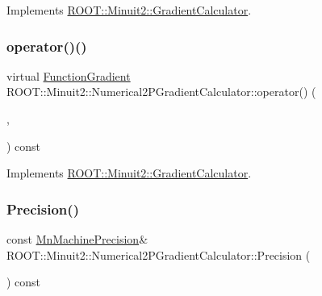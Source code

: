 Implements \mbox{\hyperlink{classROOT_1_1Minuit2_1_1GradientCalculator_a1809c1e8a89d32aabf7835e9690c2916}{R\+O\+O\+T\+::\+Minuit2\+::\+Gradient\+Calculator}}.

\mbox{\label{classROOT_1_1Minuit2_1_1Numerical2PGradientCalculator_a9ca27ef0f61a678b528f32a002e8002b}} 
\subsubsection{\texorpdfstring{operator()()}{operator()()}\hspace{0.1cm}{\footnotesize\ttfamily [9/9]}}
{\footnotesize\ttfamily virtual \mbox{\hyperlink{classROOT_1_1Minuit2_1_1FunctionGradient}{Function\+Gradient}} R\+O\+O\+T\+::\+Minuit2\+::\+Numerical2\+P\+Gradient\+Calculator\+::operator() (\begin{DoxyParamCaption}\item[{const \mbox{\hyperlink{classROOT_1_1Minuit2_1_1MinimumParameters}{Minimum\+Parameters}} \&}]{,  }\item[{const \mbox{\hyperlink{classROOT_1_1Minuit2_1_1FunctionGradient}{Function\+Gradient}} \&}]{ }\end{DoxyParamCaption}) const\hspace{0.3cm}{\ttfamily [virtual]}}



Implements \mbox{\hyperlink{classROOT_1_1Minuit2_1_1GradientCalculator_a1809c1e8a89d32aabf7835e9690c2916}{R\+O\+O\+T\+::\+Minuit2\+::\+Gradient\+Calculator}}.

\mbox{\label{classROOT_1_1Minuit2_1_1Numerical2PGradientCalculator_a2f964953d797badaf6f2cd476e330c3f}} 
\subsubsection{\texorpdfstring{Precision()}{Precision()}\hspace{0.1cm}{\footnotesize\ttfamily [1/3]}}
{\footnotesize\ttfamily const \mbox{\hyperlink{classROOT_1_1Minuit2_1_1MnMachinePrecision}{Mn\+Machine\+Precision}}\& R\+O\+O\+T\+::\+Minuit2\+::\+Numerical2\+P\+Gradient\+Calculator\+::\+Precision (\begin{DoxyParamCaption}{ }\end{DoxyParamCaption}) const}

